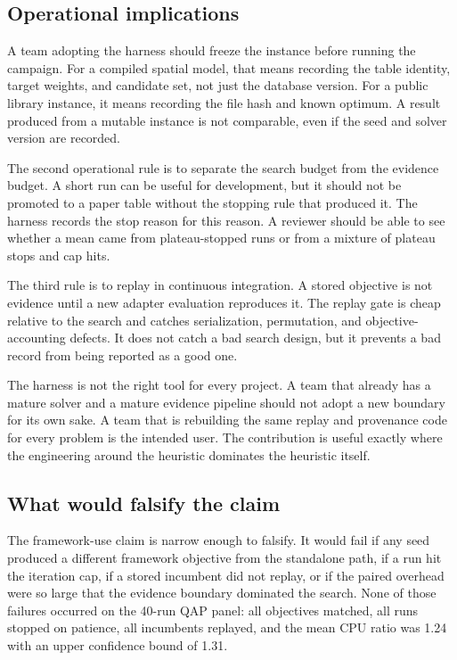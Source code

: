 \documentclass[11pt]{article}
\begin{document}
\subsection{Operational implications}

A team adopting the harness should freeze the instance before running the campaign. For a compiled
spatial model, that means recording the table identity, target weights, and candidate set, not just
the database version. For a public library instance, it means recording the file hash and known
optimum. A result produced from a mutable instance is not comparable, even if the seed and solver
version are recorded.

The second operational rule is to separate the search budget from the evidence budget. A short run
can be useful for development, but it should not be promoted to a paper table without the stopping
rule that produced it. The harness records the stop reason for this reason. A reviewer should be able
to see whether a mean came from plateau-stopped runs or from a mixture of plateau stops and cap hits.

The third rule is to replay in continuous integration. A stored objective is not evidence until a
new adapter evaluation reproduces it. The replay gate is cheap relative to the search and catches
serialization, permutation, and objective-accounting defects. It does not catch a bad search design,
but it prevents a bad record from being reported as a good one.

The harness is not the right tool for every project. A team that already has a mature solver and a
mature evidence pipeline should not adopt a new boundary for its own sake. A team that is rebuilding
the same replay and provenance code for every problem is the intended user. The contribution is
useful exactly where the engineering around the heuristic dominates the heuristic itself.

\subsection{What would falsify the claim}

The framework-use claim is narrow enough to falsify. It would fail if any seed produced a different
framework objective from the standalone path, if a run hit the iteration cap, if a stored incumbent
did not replay, or if the paired overhead were so large that the evidence boundary dominated the
search. None of those failures occurred on the 40-run QAP panel: all objectives matched, all runs
stopped on patience, all incumbents replayed, and the mean CPU ratio was 1.24 with an upper
confidence bound of 1.31.
\end{document}
